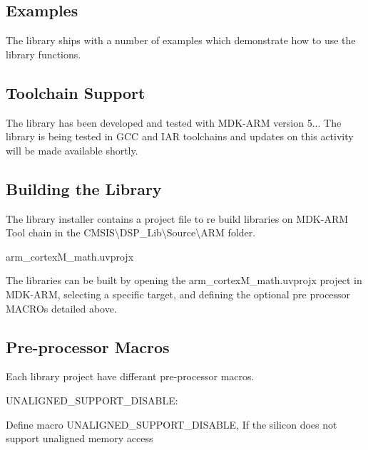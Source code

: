 \subsection*{Examples }

The library ships with a number of examples which demonstrate how to use the library functions.

\subsection*{Toolchain Support }

The library has been developed and tested with M\+D\+K-\/\+A\+RM version 5... The library is being tested in G\+CC and I\+AR toolchains and updates on this activity will be made available shortly.

\subsection*{Building the Library }

The library installer contains a project file to re build libraries on M\+D\+K-\/\+A\+RM Tool chain in the {\ttfamily C\+M\+S\+IS\textbackslash{}D\+S\+P\+\_\+\+Lib\textbackslash{}Source\textbackslash{}A\+RM} folder.
\begin{DoxyItemize}
\item arm\+\_\+cortex\+M\+\_\+math.\+uvprojx
\end{DoxyItemize}

The libraries can be built by opening the arm\+\_\+cortex\+M\+\_\+math.\+uvprojx project in M\+D\+K-\/\+A\+RM, selecting a specific target, and defining the optional pre processor M\+A\+C\+R\+Os detailed above.

\subsection*{Pre-\/processor Macros }

Each library project have differant pre-\/processor macros.


\begin{DoxyItemize}
\item U\+N\+A\+L\+I\+G\+N\+E\+D\+\_\+\+S\+U\+P\+P\+O\+R\+T\+\_\+\+D\+I\+S\+A\+B\+LE\+:
\end{DoxyItemize}

Define macro U\+N\+A\+L\+I\+G\+N\+E\+D\+\_\+\+S\+U\+P\+P\+O\+R\+T\+\_\+\+D\+I\+S\+A\+B\+LE, If the silicon does not support unaligned memory access


